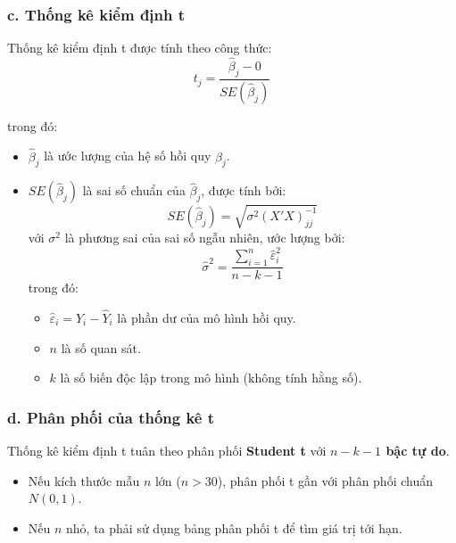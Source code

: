 \subsubsection{c. Thống kê kiểm định t}

Thống kê kiểm định t được tính theo công thức:
\begin{equation}
    t_j = \frac{\hat{\beta}_j - 0}{SE(\hat{\beta}_j)}
\end{equation}

trong đó:

\begin{itemize}
    \item $\hat{\beta}_j$ là ước lượng của hệ số hồi quy $\beta_j$.
    \item $SE(\hat{\beta}_j)$ là sai số chuẩn của $\hat{\beta}_j$, được tính bởi:
    \begin{equation}
        SE(\hat{\beta}_j) = \sqrt{\sigma^2 (X'X)^{-1}_{jj}}
    \end{equation}
    với $\sigma^2$ là phương sai của sai số ngẫu nhiên, ước lượng bởi:
    \begin{equation}
        \hat{\sigma}^2 = \frac{\sum_{i=1}^{n} \hat{\varepsilon}_i^2}{n - k - 1}
    \end{equation}
    trong đó:
    \begin{itemize}
        \item $\hat{\varepsilon}_i = Y_i - \hat{Y}_i$ là phần dư của mô hình hồi quy.
        \item $n$ là số quan sát.
        \item $k$ là số biến độc lập trong mô hình (không tính hằng số).
    \end{itemize}
\end{itemize}

\subsubsection{d. Phân phối của thống kê t}

Thống kê kiểm định t tuân theo phân phối \textbf{Student t} với \textbf{$n - k - 1$ bậc tự do}.

\begin{itemize}
    \item Nếu kích thước mẫu $n$ lớn ($n > 30$), phân phối t gần với phân phối chuẩn $N(0,1)$.
    \item Nếu $n$ nhỏ, ta phải sử dụng bảng phân phối t để tìm giá trị tới hạn.
\end{itemize}

